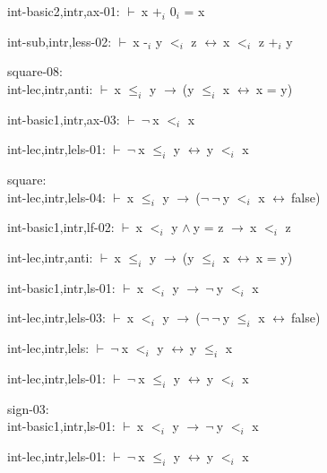 \documentclass[a4paper]{article}
\newcommand{\Fol}{\mbox{$\vdash\ $}}
\newcommand{\Not}{\mbox{$\neg\ $}}
\newcommand{\And}{\mbox{$\wedge\ $}}
\newcommand{\Imp}{\mbox{$\rightarrow\ $}}
\newcommand{\Equiv}{\mbox{$\leftrightarrow\ $}}
\begin{document}
int-basic2,intr,ax-01: 
 \Fol x $\mbox{+}_{i}$ $\mbox{0}_{i}$ = x



int-sub,intr,less-02: 
 \Fol x $\mbox{-}_{i}$ y $\mbox{$<$}_{i}$ z \Equiv x $\mbox{$<$}_{i}$ z $\mbox{+}_{i}$ y



\bigskip

square-08:\\ int-lec,intr,anti: 
 \Fol x $\mbox{$\le$}_{i}$ y \Imp (y $\mbox{$\le$}_{i}$ x \Equiv x = y)

int-basic1,intr,ax-03: 
 \Fol \Not x $\mbox{$<$}_{i}$ x



int-lec,intr,lels-01: 
 \Fol \Not x $\mbox{$\le$}_{i}$ y \Equiv y $\mbox{$<$}_{i}$ x



\bigskip

square:\\ int-lec,intr,lels-04: 
 \Fol x $\mbox{$\le$}_{i}$ y \Imp (\Not \Not y $\mbox{$<$}_{i}$ x \Equiv false)



int-basic1,intr,lf-02: 
 \Fol x $\mbox{$<$}_{i}$ y \And y = z \Imp x $\mbox{$<$}_{i}$ z



int-lec,intr,anti: 
 \Fol x $\mbox{$\le$}_{i}$ y \Imp (y $\mbox{$\le$}_{i}$ x \Equiv x = y)



int-basic1,intr,ls-01: 
 \Fol x $\mbox{$<$}_{i}$ y \Imp \Not y $\mbox{$<$}_{i}$ x



int-lec,intr,lels-03: 
 \Fol x $\mbox{$<$}_{i}$ y \Imp (\Not \Not y $\mbox{$\le$}_{i}$ x \Equiv false)



int-lec,intr,lels: 
 \Fol \Not x $\mbox{$<$}_{i}$ y \Equiv y $\mbox{$\le$}_{i}$ x



int-lec,intr,lels-01: 
 \Fol \Not x $\mbox{$\le$}_{i}$ y \Equiv y $\mbox{$<$}_{i}$ x



\bigskip

sign-03:\\ int-basic1,intr,ls-01: 
 \Fol x $\mbox{$<$}_{i}$ y \Imp \Not y $\mbox{$<$}_{i}$ x



int-lec,intr,lels-01: 
 \Fol \Not x $\mbox{$\le$}_{i}$ y \Equiv y $\mbox{$<$}_{i}$ x
\end{document}
